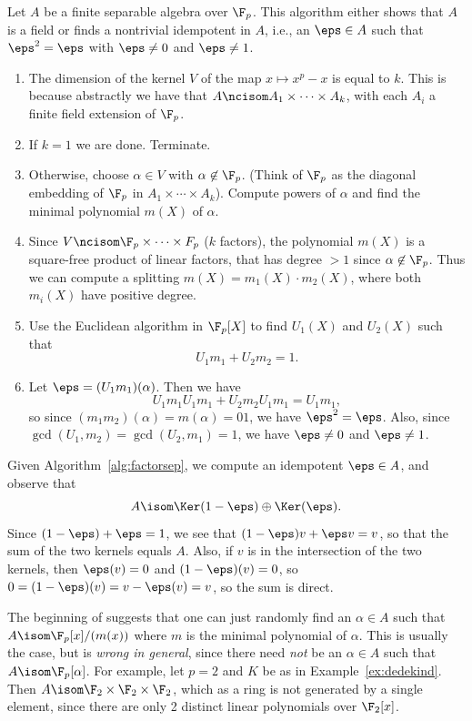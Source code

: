 \begin{algorithm}\label{alg:factorsep}
Let $A$ be a finite separable algebra over $\F_p$.  This
algorithm either shows that $A$ is a field or finds
a nontrivial idempotent in $A$, i.e., an $\eps\in A$
such that $\eps^2 = \eps$ with $\eps\neq 0$ and $\eps\neq 1$.
\begin{enumerate}
\item The dimension of the kernel $V$ of the map $x\mapsto x^p - x$ is
  equal to $k$.  This is because abstractly we have that $A\ncisom
  A_1\times \cdots \times A_k$, with each $A_i$ a finite field
  extension of $\F_p$.
\item If $k=1$ we are done.  Terminate.
\item Otherwise, choose $\alpha \in V$ with $\alpha \not\in \F_p$.
(Think of $\F_p$ as the diagonal embedding of $\F_p$ in
$A_1\times \cdots \times A_k$).
Compute powers of $\alpha$ and find the minimal polynomial $m(X)$
of $\alpha$.
\item Since $V\ncisom \F_p \times \cdots \times F_p$ ($k$ factors),
the polynomial $m(X)$ is a square-free product of linear factors, that
has degree $>1$ since $\alpha\not\in\F_p$.  Thus we can compute
a splitting $m(X) = m_1(X) \cdot m_2(X)$, where both $m_i(X)$ have
positive degree.
\item Use the Euclidean algorithm in $\F_p[X]$ to find
$U_1(X)$ and $U_2(X)$ such that
$$
  U_1 m_1 + U_2 m_2 = 1.
$$
\item Let $\eps = (U_1 m_1)(\alpha)$.  Then we have
$$
  U_1 m_1 U_1 m_1 + U_2 m_2 U_1 m_1 = U_1 m_1,
$$
so since $(m_1 m_2)(\alpha) = m(\alpha)=01$, we have $\eps^2 = \eps$.
Also, since $\gcd(U_1, m_2) = \gcd(U_2, m_1) = 1$,
we have $\eps\neq 0$ and $\eps \neq 1$.
\end{enumerate}
\end{algorithm}

Given Algorithm~\ref{alg:factorsep}, we compute an idempotent
$\eps \in A$, and observe that
$$
 A \isom \Ker(1 - \eps)  \oplus \Ker(\eps).
$$
Since $(1 - \eps) + \eps = 1$, we see that
$(1 - \eps)v + \eps v = v$, so that the sum
of the two kernels equals $A$.
Also, if $v$ is in the intersection of the two kernels,
then $\eps(v) = 0$ and $(1-\eps)(v) =0$, so
$0 = (1-\eps)(v) = v - \eps(v) = v$, so the sum is direct.

\begin{remark}
  The beginning of \cite[\S6.2.4]{cohen:course_ant} suggests that one
  can just randomly find an $\alpha \in A$ such that $A\isom
  \F_p[x]/(m(x))$ where $m$ is the minimal polynomial of $\alpha$.
  This is usually the case, but is {\em wrong in general}, since there
  need {\em not} be an $\alpha \in A$ such that $A \isom
  \F_p[\alpha]$.  For example, let $p=2$ and $K$ be as in
  Example~\ref{ex:dedekind}.  Then $A\isom \F_2 \times \F_2 \times
  \F_2$, which as a ring is not generated by a single element, since
  there are only 2 distinct linear polynomials over $\F_2[x]$.
\end{remark}

